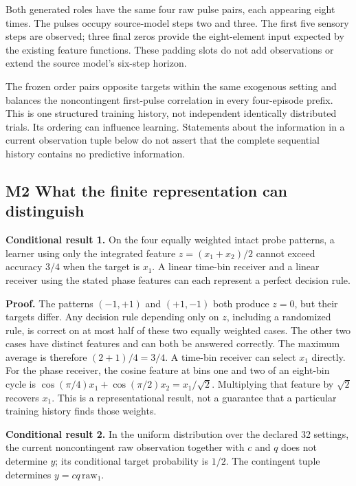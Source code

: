 \documentclass[
  american,
  11pt,
  letterpaper,
]{article}
\begin{document}
Both generated roles have the same four raw pulse pairs, each appearing eight times. The pulses occupy source-model steps two and three. The first five sensory steps are observed; three final zeros provide the eight-element input expected by the existing feature functions. These padding slots do not add observations or extend the source model's six-step horizon.

The frozen order pairs opposite targets within the same exogenous setting and balances the noncontingent first-pulse correlation in every four-episode prefix. This is one structured training history, not independent identically distributed trials. Its ordering can influence learning. Statements about the information in a current observation tuple below do not assert that the complete sequential history contains no predictive information.

\subsection{M2 What the finite representation can distinguish}\label{m2-what-the-finite-representation-can-distinguish}

\textbf{Conditional result 1.} On the four equally weighted intact probe patterns, a learner using only the integrated feature \(z=(x_1+x_2)/2\) cannot exceed accuracy \(3/4\) when the target is \(x_1\). A linear time-bin receiver and a linear receiver using the stated phase features can each represent a perfect decision rule.

\textbf{Proof.} The patterns \((-1,+1)\) and \((+1,-1)\) both produce \(z=0\), but their targets differ. Any decision rule depending only on \(z\), including a randomized rule, is correct on at most half of these two equally weighted cases. The other two cases have distinct features and can both be answered correctly. The maximum average is therefore \((2+1)/4=3/4\). A time-bin receiver can select \(x_1\) directly. For the phase receiver, the cosine feature at bins one and two of an eight-bin cycle is \(\cos(\pi/4)x_1+\cos(\pi/2)x_2=x_1/\sqrt{2}\). Multiplying that feature by \(\sqrt{2}\) recovers \(x_1\). This is a representational result, not a guarantee that a particular training history finds those weights.

\textbf{Conditional result 2.} In the uniform distribution over the declared 32 settings, the current noncontingent raw observation together with \(c\) and \(q\) does not determine \(y\); its conditional target probability is \(1/2\). The contingent tuple determines \(y=cq\,\mathrm{raw}_1\).
\end{document}
